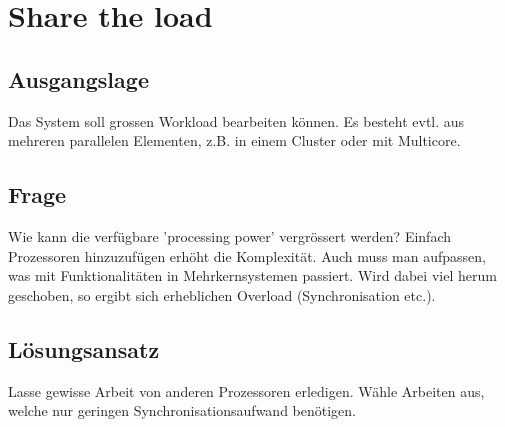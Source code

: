 \section{Share the load}

\subsection{Ausgangslage}


Das System soll grossen Workload bearbeiten können. Es besteht evtl. aus mehreren parallelen Elementen, z.B. in einem Cluster oder mit Multicore.

\subsection{Frage}


Wie kann die verfügbare 'processing power' vergrössert werden?
Einfach Prozessoren hinzuzufügen erhöht die Komplexität. Auch muss man aufpassen, was mit Funktionalitäten in Mehrkernsystemen passiert. Wird dabei viel herum geschoben, so ergibt sich erheblichen Overload (Synchronisation etc.).

\subsection{Lösungsansatz}


Lasse gewisse Arbeit von anderen Prozessoren erledigen. Wähle Arbeiten aus, welche nur geringen Synchronisationsaufwand benötigen.
